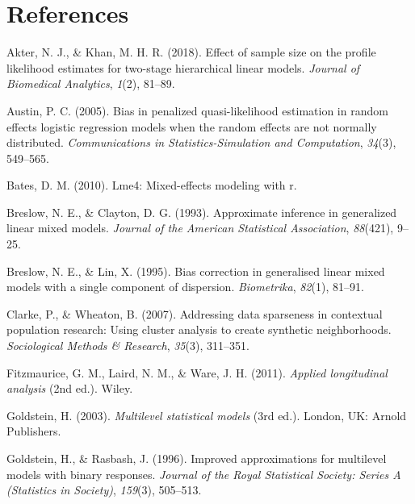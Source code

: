 \documentclass[12pt,oneside,a4paper]{reedthesis}
\begin{document}
\hypertarget{references}{%
\chapter*{References}\label{references}}


\noindent

\setlength{\parindent}{-0.20in}
\setlength{\leftskip}{0.20in}
\setlength{\parskip}{8pt}

\hypertarget{refs}{}
\leavevmode\hypertarget{ref-akter2018effect}{}%
Akter, N. J., \& Khan, M. H. R. (2018). Effect of sample size on the profile likelihood estimates for two-stage hierarchical linear models. \emph{Journal of Biomedical Analytics}, \emph{1}(2), 81--89.

\leavevmode\hypertarget{ref-austin2005bias}{}%
Austin, P. C. (2005). Bias in penalized quasi-likelihood estimation in random effects logistic regression models when the random effects are not normally distributed. \emph{Communications in Statistics-Simulation and Computation}, \emph{34}(3), 549--565.

\leavevmode\hypertarget{ref-bates2010lme4}{}%
Bates, D. M. (2010). Lme4: Mixed-effects modeling with r.

\leavevmode\hypertarget{ref-breslow1993approximate}{}%
Breslow, N. E., \& Clayton, D. G. (1993). Approximate inference in generalized linear mixed models. \emph{Journal of the American Statistical Association}, \emph{88}(421), 9--25.

\leavevmode\hypertarget{ref-breslow1995bias}{}%
Breslow, N. E., \& Lin, X. (1995). Bias correction in generalised linear mixed models with a single component of dispersion. \emph{Biometrika}, \emph{82}(1), 81--91.

\leavevmode\hypertarget{ref-clarke2007addressing}{}%
Clarke, P., \& Wheaton, B. (2007). Addressing data sparseness in contextual population research: Using cluster analysis to create synthetic neighborhoods. \emph{Sociological Methods \& Research}, \emph{35}(3), 311--351.

\leavevmode\hypertarget{ref-garrett2011}{}%
Fitzmaurice, G. M., Laird, N. M., \& Ware, J. H. (2011). \emph{Applied longitudinal analysis} (2nd ed.). Wiley.

\leavevmode\hypertarget{ref-goldstein2003}{}%
Goldstein, H. (2003). \emph{Multilevel statistical models} (3rd ed.). London, UK: Arnold Publishers.

\leavevmode\hypertarget{ref-goldstein1996improved}{}%
Goldstein, H., \& Rasbash, J. (1996). Improved approximations for multilevel models with binary responses. \emph{Journal of the Royal Statistical Society: Series A (Statistics in Society)}, \emph{159}(3), 505--513.
\end{document}
